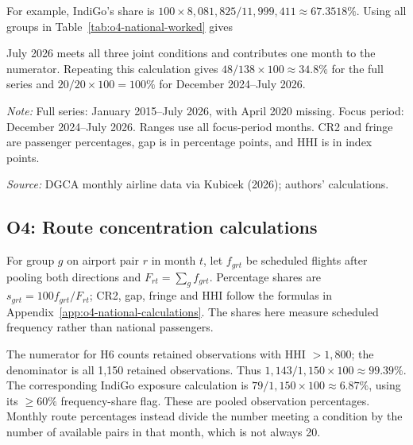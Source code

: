 \documentclass[12pt,a4paper]{article}
\begin{document}
For example, IndiGo's share is $100\times8{,}081{,}825/11{,}999{,}411\approx67.3518\%$. Using all groups in Table~\ref{tab:o4-national-worked} gives

July 2026 meets all three joint conditions and contributes one month to the numerator. Repeating this calculation gives $48/138\times100\approx34.8\%$ for the full series and $20/20\times100=100\%$ for December 2024--July 2026.


\medskip
\begin{minipage}{\linewidth}
\captionsetup{font=small,labelfont=bf,justification=raggedright,singlelinecheck=false,hypcap=false}
\label{tab:o4-national-complete}
\centering
{\small{}\setlength{\tabcolsep}{4pt}\par}
\vspace{4pt}
{\footnotesize{}\raggedright\textit{Note:} Full series: January 2015--July 2026, with April 2020 missing. Focus period: December 2024--July 2026. Ranges use all focus-period months. CR2 and fringe are passenger percentages, gap is in percentage points, and HHI is in index points.\par
\textit{Source:} DGCA monthly airline data via Kubicek (2026); authors' calculations.\par}
\end{minipage}

\clearpage
\subsection{O4: Route concentration calculations}
\label{app:o4-route-calculations}
For group $g$ on airport pair $r$ in month $t$, let $f_{grt}$ be scheduled flights after pooling both directions and $F_{rt}=\sum_g f_{grt}$. Percentage shares are $s_{grt}=100f_{grt}/F_{rt}$; CR2, gap, fringe and HHI follow the formulas in Appendix~\ref{app:o4-national-calculations}. The shares here measure scheduled frequency rather than national passengers.

The numerator for H6 counts retained observations with HHI $>1{,}800$; the denominator is all 1,150 retained observations. Thus $1{,}143/1{,}150\times100\approx99.39\%$. The corresponding IndiGo exposure calculation is $79/1{,}150\times100\approx6.87\%$, using its $\geq60\%$ frequency-share flag. These are pooled observation percentages. Monthly route percentages instead divide the number meeting a condition by the number of available pairs in that month, which is not always 20.
\end{document}
